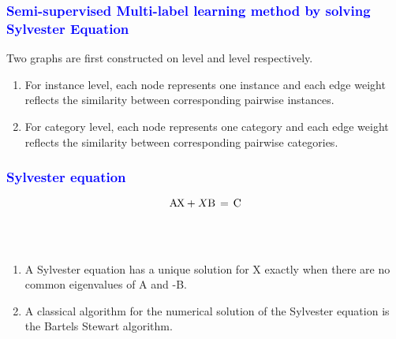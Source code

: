 \documentclass{beamer}
\newcommand{\tikzmark}[3][]{\tikz[overlay,remember picture,baseline] \node [anchor=base,#1](#2) {#3};}
\begin{document}
\begin{frame}
\frametitle{\textcolor{blue}{Semi-supervised Multi-label learning method by solving Sylvester Equation}}
 Two graphs are first constructed on {\color{blue}{instance}} level and {\color{blue}{category}} level respectively.

\begin{enumerate}
\item For instance
level,  each node represents
one instance and each edge weight reflects the similarity
between corresponding pairwise instances.
\item For category level, each node represents one category
and each edge weight reflects the similarity between
corresponding pairwise categories.
\end{enumerate}


\end{frame}

\begin{frame}
\frametitle{\textcolor{blue}{Sylvester equation}}

\[
\tikzmark{A}{A}\,\,\,\,\tikzmark{X}{X}\,\, + X\,\, \tikzmark{B}{B}\,\,\, = \,\,\,\tikzmark{C}{C}
\]

~\\
~\\
\begin{enumerate}
\item A Sylvester equation has a unique solution for X exactly when there are no common eigenvalues of A and -B.
\item A classical algorithm for the numerical solution of the Sylvester equation is the Bartels Stewart algorithm.
\end{enumerate}



\end{frame}
\end{document}
